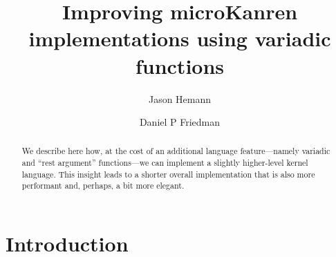 \documentclass[sigplan,screen,draft,anonymous,review,natbib=false]{acmart}
\begin{document}
\title{Improving microKanren implementations using variadic functions}

\author{Jason Hemann}
\author{Daniel P Friedman}

\renewcommand{\shortauthors}{Hemann et al.}

\begin{abstract}
We describe here how, at the cost of an additional language
feature---namely variadic and \enquote{rest argument} functions---we
can implement a slightly higher-level kernel language. This insight
leads to a shorter overall implementation that is also more performant
and, perhaps, a bit more elegant.
\end{abstract}


\keywords{}

\maketitle

\section{Introduction}
\end{document}
